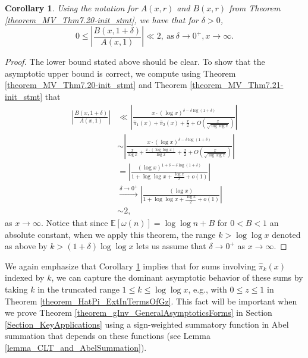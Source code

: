 \documentclass[11pt,reqno,a4letter]{article}
\numberwithin{figure}{section}
\numberwithin{table}{section}
\theoremstyle{plain}
\newtheorem{cor}[theorem]{Corollary}
\numberwithin{theorem}{section}
\theoremstyle{definition}
\begin{document}
\begin{cor} 
\label{theorem_MV_Thm7.20} 
Using the notation for $A(x, r)$ and $B(x, r)$ from 
Theorem \ref{theorem_MV_Thm7.20-init_stmt}, 
we have that for $\delta > 0$, 
\[
0 \leq \left\lvert \frac{B(x, 1+\delta)}{A(x, 1)} \right\rvert \ll 2, 
     \mathrm{\ as\ } \delta \rightarrow 0^{+}, x \rightarrow \infty. 
\]
\end{cor} 
\begin{proof} 
The lower bound stated above should be clear. To show that the asymptotic 
upper bound is correct, we compute using Theorem \ref{theorem_MV_Thm7.20-init_stmt} and 
Theorem \ref{theorem_MV_Thm7.21-init_stmt} that 
\begin{align*} 
\left\lvert \frac{B(x, 1+\delta)}{A(x, 1)} \right\rvert & \ll 
     \left\lvert \frac{x \cdot (\log x)^{\delta - \delta\log(1+\delta)}}{ 
     \widehat{\pi}_1(x) + \widehat{\pi}_2(x) + \frac{x}{2} + 
     O\left(\frac{x}{\sqrt{\log\log x}}\right)} \right\rvert \\ 
     & \sim 
     \left\lvert \frac{x \cdot (\log x)^{\delta - \delta\log(1+\delta)}}{ 
     \frac{x}{\log x} + \frac{x \cdot (\log\log x)}{\log x} + \frac{x}{2} + 
     O\left(\frac{x}{\sqrt{\log\log x}}\right)} \right\rvert \\ 
     & = 
     \left\lvert \frac{(\log x)^{1 + \delta - \delta\log(1+\delta)}}{ 
     1 + \log\log x + \frac{\log x}{2} + o(1)}\right\rvert \\ 
     & \xrightarrow{\delta \rightarrow 0^{+}} 
     \left\lvert \frac{(\log x)}{ 
     1 + \log\log x + \frac{\log x}{2} + o(1)} \right\rvert \\ 
     & \sim 2, 
\end{align*} 
as $x \rightarrow \infty$. Notice that since $\mathbb{E}[\omega(n)] = \log\log n + B$ for $0 < B < 1$ an 
absolute constant, when we apply this theorem, the range $k > \log\log x$ denoted as above by 
$k > (1 + \delta) \log\log x$ lets us assume that $\delta \rightarrow 0^{+}$ as 
$x \rightarrow \infty$. 
\end{proof} 

We again emphasize that 
Corollary \ref{theorem_MV_Thm7.20} implies that for sums involving $\widehat{\pi}_k(x)$ indexed by $k$, 
we can capture the dominant asymptotic behavior of these sums by taking $k$ in the truncated range 
$1 \leq k \leq \log\log x$, e.g., with $0 \leq z \leq 1$ in Theorem \ref{theorem_HatPi_ExtInTermsOfGz}. 
This fact will be important when we prove 
Theorem \ref{theorem_gInv_GeneralAsymptoticsForms} in 
Section \ref{Section_KeyApplications} using a sign-weighted 
summatory function in Abel summation that depends on these functions 
(see Lemma \ref{lemma_CLT_and_AbelSummation}). 
\end{document}

